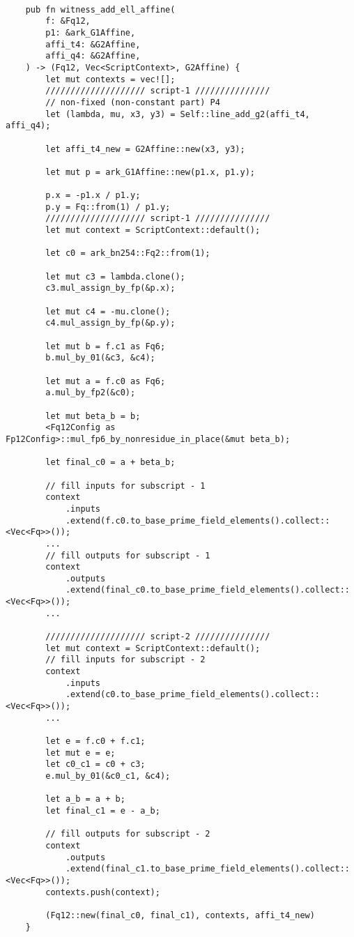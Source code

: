 \begin{lstlisting}

    pub fn witness_add_ell_affine(
        f: &Fq12,
        p1: &ark_G1Affine,
        affi_t4: &G2Affine,
        affi_q4: &G2Affine,
    ) -> (Fq12, Vec<ScriptContext>, G2Affine) {
        let mut contexts = vec![];
        //////////////////// script-1 ///////////////
        // non-fixed (non-constant part) P4
        let (lambda, mu, x3, y3) = Self::line_add_g2(affi_t4, affi_q4);

        let affi_t4_new = G2Affine::new(x3, y3);

        let mut p = ark_G1Affine::new(p1.x, p1.y);

        p.x = -p1.x / p1.y;
        p.y = Fq::from(1) / p1.y;
        //////////////////// script-1 ///////////////
        let mut context = ScriptContext::default();

        let c0 = ark_bn254::Fq2::from(1);

        let mut c3 = lambda.clone();
        c3.mul_assign_by_fp(&p.x);

        let mut c4 = -mu.clone();
        c4.mul_assign_by_fp(&p.y);

        let mut b = f.c1 as Fq6;
        b.mul_by_01(&c3, &c4);

        let mut a = f.c0 as Fq6;
        a.mul_by_fp2(&c0);

        let mut beta_b = b;
        <Fq12Config as Fp12Config>::mul_fp6_by_nonresidue_in_place(&mut beta_b);

        let final_c0 = a + beta_b;

        // fill inputs for subscript - 1
        context
            .inputs
            .extend(f.c0.to_base_prime_field_elements().collect::<Vec<Fq>>());
        ...
        // fill outputs for subscript - 1
        context
            .outputs
            .extend(final_c0.to_base_prime_field_elements().collect::<Vec<Fq>>());
        ...

        //////////////////// script-2 ///////////////
        let mut context = ScriptContext::default();
        // fill inputs for subscript - 2
        context
            .inputs
            .extend(c0.to_base_prime_field_elements().collect::<Vec<Fq>>());
        ...

        let e = f.c0 + f.c1;
        let mut e = e;
        let c0_c1 = c0 + c3;
        e.mul_by_01(&c0_c1, &c4);

        let a_b = a + b;
        let final_c1 = e - a_b;

        // fill outputs for subscript - 2
        context
            .outputs
            .extend(final_c1.to_base_prime_field_elements().collect::<Vec<Fq>>());
        contexts.push(context);

        (Fq12::new(final_c0, final_c1), contexts, affi_t4_new)
    }

\end{lstlisting}
